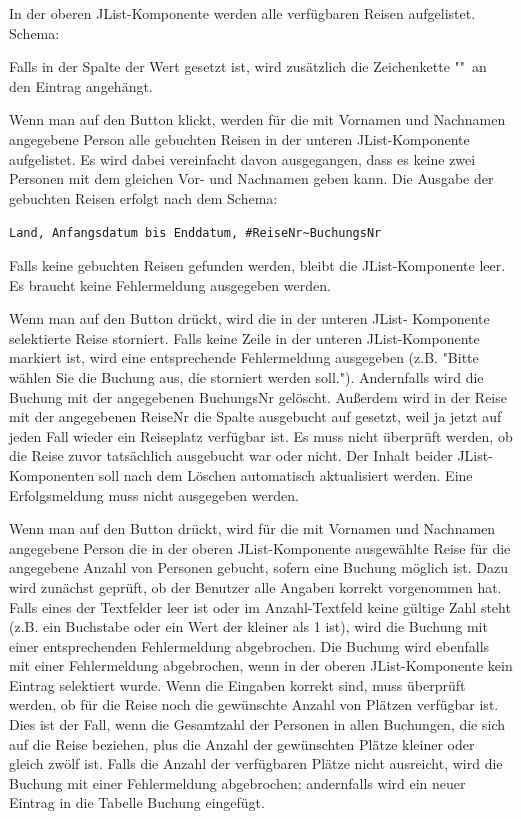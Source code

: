 \begin{compactenum}[a)]
In der oberen JList-Komponente werden alle verfügbaren Reisen aufgelistet. Schema:


Falls in der Spalte  der Wert  gesetzt
ist, wird zusätzlich die Zeichenkette ""\ an den
Eintrag angehängt.

Wenn man auf den Button  klickt, werden für die mit
Vornamen und Nachnamen angegebene Person alle gebuchten Reisen in der unteren
JList-Komponente aufgelistet. Es wird dabei vereinfacht davon ausgegangen, dass
es keine zwei Personen mit dem gleichen Vor- und Nachnamen geben kann. Die
Ausgabe der gebuchten Reisen erfolgt nach dem Schema:

\verb|Land, Anfangsdatum bis Enddatum, #ReiseNr~BuchungsNr|

Falls keine gebuchten Reisen gefunden werden, bleibt die JList-Komponente leer.
Es braucht keine Fehlermeldung ausgegeben werden.

Wenn man auf den Button  drückt, wird die in
der unteren JList- Komponente selektierte Reise storniert. Falls keine Zeile in
der unteren JList-Komponente markiert ist, wird eine entsprechende
Fehlermeldung ausgegeben (z.B. "Bitte wählen Sie die Buchung aus, die storniert
werden soll."). Andernfalls wird die Buchung mit der angegebenen BuchungsNr gelöscht.
Außerdem wird in der Reise mit der angegebenen ReiseNr die Spalte ausgebucht
auf  gesetzt, weil ja jetzt auf jeden Fall wieder ein
Reiseplatz verfügbar ist. Es muss nicht überprüft werden, ob die Reise zuvor
tatsächlich ausgebucht war oder nicht. Der Inhalt beider JList-Komponenten soll
nach dem Löschen automatisch aktualisiert werden. Eine Erfolgsmeldung muss
nicht ausgegeben werden.

Wenn man auf den Button  drückt, wird für die mit
Vornamen und Nachnamen angegebene Person die in der oberen JList-Komponente
ausgewählte Reise für die angegebene Anzahl von Personen gebucht, sofern eine
Buchung möglich ist. Dazu wird zunächst geprüft, ob der Benutzer alle Angaben
korrekt vorgenommen hat. Falls eines der Textfelder leer ist oder im
Anzahl-Textfeld keine gültige Zahl steht (z.B. ein Buchstabe oder ein Wert der
kleiner als 1 ist), wird die Buchung mit einer entsprechenden Fehlermeldung
abgebrochen. Die Buchung wird ebenfalls mit einer Fehlermeldung abgebrochen,
wenn in der oberen JList-Komponente kein Eintrag selektiert wurde. Wenn die
Eingaben korrekt sind, muss überprüft werden, ob für die Reise noch die
gewünschte Anzahl von Plätzen verfügbar ist. Dies ist der Fall, wenn die
Gesamtzahl der Personen in allen Buchungen, die sich auf die Reise beziehen,
plus die Anzahl der gewünschten Plätze kleiner oder gleich zwölf ist. Falls die
Anzahl der verfügbaren Plätze nicht ausreicht, wird die Buchung mit einer
Fehlermeldung abgebrochen; andernfalls wird ein neuer Eintrag in die Tabelle
Buchung eingefügt.


\end{compactenum}
